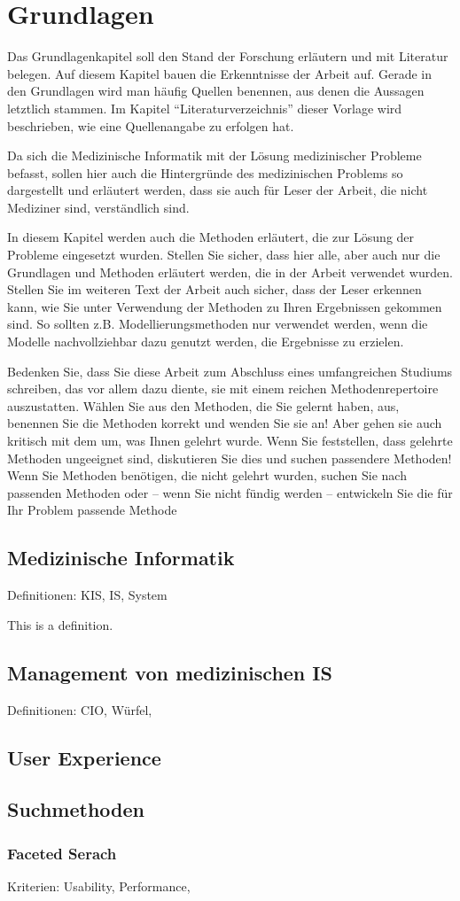 \chapter{Grundlagen}\label{ch:preliminaries}

Das Grundlagenkapitel soll den Stand der Forschung erläutern und mit Literatur belegen.
Auf diesem Kapitel bauen die Erkenntnisse der Arbeit auf.
Gerade in den Grundlagen wird man häufig Quellen benennen, aus denen die Aussagen letztlich stammen.
Im Kapitel \enquote{Literaturverzeichnis} dieser Vorlage wird beschrieben, wie eine Quellenangabe zu erfolgen hat.

Da sich die Medizinische Informatik mit der Lösung medizinischer Probleme befasst, sollen hier auch die Hintergründe des medizinischen Problems so dargestellt und erläutert werden, dass sie auch für Leser der Arbeit, die nicht Mediziner sind, verständlich sind.

In diesem Kapitel werden auch die Methoden erläutert, die zur Lösung der Probleme eingesetzt wurden.
Stellen Sie sicher, dass hier alle, aber auch nur die Grundlagen und Methoden erläutert werden, die in der Arbeit verwendet wurden.
Stellen Sie im weiteren Text der Arbeit auch sicher, dass der Leser erkennen kann, wie Sie unter Verwendung der Methoden zu Ihren Ergebnissen gekommen sind.
So sollten z.B. Modellierungsmethoden nur verwendet werden, wenn die Modelle nachvollziehbar dazu genutzt werden, die Ergebnisse zu erzielen.

Bedenken Sie, dass Sie diese Arbeit zum Abschluss eines umfangreichen Studiums schreiben, das vor allem dazu diente, sie mit einem reichen Methodenrepertoire auszustatten.
Wählen Sie aus den Methoden, die Sie gelernt haben, aus, benennen Sie die Methoden korrekt und wenden Sie sie an! Aber gehen sie auch kritisch mit dem um, was Ihnen gelehrt wurde.
Wenn Sie feststellen, dass gelehrte Methoden ungeeignet sind, diskutieren Sie dies und suchen passendere Methoden! Wenn Sie Methoden benötigen, die nicht gelehrt wurden, suchen Sie nach passenden Methoden oder -- wenn Sie nicht fündig werden -- entwickeln Sie die für Ihr Problem passende Methode 

\section{Medizinische Informatik}\label{sec:mi}
Definitionen: KIS, IS, System
\begin{definition}[KIS]
  This is a definition.
\end{definition}

\section{Management von medizinischen IS}\label{sec:management}
Definitionen: CIO, Würfel, 

\section{User Experience}\label{sec:ux}

\section{Suchmethoden}\label{sec:sm}
\subsection{Faceted Serach}\label{sec:fs}
Kriterien: Usability, Performance, 